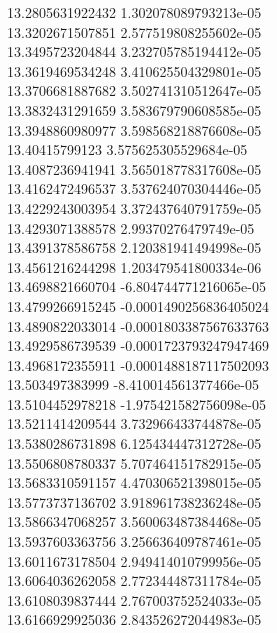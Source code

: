 {13.2805631922432 1.302078089793213e-05 \\
13.3202671507851 2.577519808255602e-05 \\
13.3495723204844 3.232705785194412e-05 \\
13.3619469534248 3.410625504329801e-05 \\
13.3706681887682 3.502741310512647e-05 \\
13.3832431291659 3.583679790608585e-05 \\
13.3948860980977 3.598568218876608e-05 \\
13.40415799123 3.575625305529684e-05 \\
13.4087236941941 3.565018778317608e-05 \\
13.4162472496537 3.537624070304446e-05 \\
13.4229243003954 3.372437640791759e-05 \\
13.4293071388578 2.99370276479749e-05 \\
13.4391378586758 2.120381941494998e-05 \\
13.4561216244298 1.203479541800334e-06 \\
13.4698821660704 -6.804744771216065e-05 \\
13.4799266915245 -0.0001490256836405024 \\
13.4890822033014 -0.0001803387567633763 \\
13.4929586739539 -0.0001723793247947469 \\
13.4968172355911 -0.0001488187117502093 \\
13.503497383999 -8.410014561377466e-05 \\
13.5104452978218 -1.975421582756098e-05 \\
13.5211414209544 3.732966433744878e-05 \\
13.5380286731898 6.125434447312728e-05 \\
13.5506808780337 5.707464151782915e-05 \\
13.5683310591157 4.470306521398015e-05 \\
13.5773737136702 3.918961738236248e-05 \\
13.5866347068257 3.560063487384468e-05 \\
13.5937603363756 3.256636409787461e-05 \\
13.6011673178504 2.949414010799956e-05 \\
13.6064036262058 2.772344487311784e-05 \\
13.6108039837444 2.767003752524033e-05 \\
13.6166929925036 2.843526272044983e-05 \\
}

